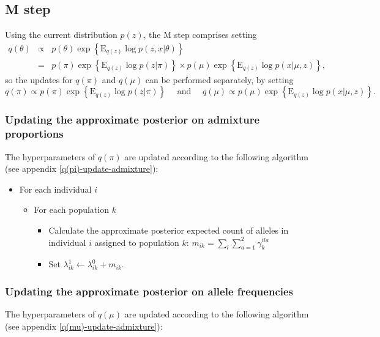 \documentclass[12pt,a4paper,reqno]{article}
\newcommand{\E}{\text{E}{}}
\newcommand{\(}{\left(}
\newcommand{\)}{\right)}
\newcommand{\|}{\arrowvert}
\begin{document}
\subsection{M step}
Using the current distribution $p(z)$, the M step comprises setting
\begin{eqnarray*}
q(\theta) &\propto& p(\theta)\exp\left\{\E_{q(z)} \log p(z,x|\theta)\right\} \\
&=& 
p(\pi)\exp\left\{\E_{q(z)} \log p(z|\pi)\right\} \times 
p(\mu)\exp\left\{\E_{q(z)} \log p(x|\mu,z)\right\},
\end{eqnarray*}
so the updates for $q(\pi)$ and $q(\mu)$ can be performed separately, by setting
\begin{equation*}
  q(\pi) \propto p(\pi)\exp\left\{\E_{q(z)} \log p(z|\pi)\right\}
  \text{~~~~and~~~~}
  q(\mu) \propto p(\mu)\exp\left\{\E_{q(z)} \log p(x|\mu,z)\right\}.
\end{equation*}

\subsubsection{Updating the approximate posterior on admixture proportions}
The hyperparameters of $q(\pi)$ are updated according to the following algorithm (see appendix \ref{q(pi)-update-admixture}):
\begin{itemize}
\item For each individual $i$
  \begin{itemize}
  \item For each population $k$
    \begin{itemize}
    \item Calculate the approximate posterior expected count of alleles in individual $i$ assigned to population $k$: $m_{ik} = \sum_{l} \sum_{a=1}^{2}\gamma^{ila}_{k}$
    \item Set $\lambda^{1}_{ik} \leftarrow \lambda^{0}_{ik} + m_{ik}$.
    \end{itemize}
  \end{itemize}
\end{itemize}

\subsubsection{Updating the approximate posterior on allele frequencies}
The hyperparameters of $q(\mu)$ are updated according to the following algorithm (see appendix \ref{q(mu)-update-admixture}):
\end{document}
